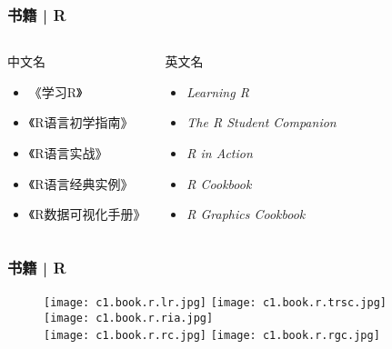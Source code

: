 \begin{frame}
  \frametitle{书籍 | R}
  \begin{columns}
  \begin{block}{中文名}
    \begin{itemize}
      \item 《学习R》
      \item 《R语言初学指南》
      \item 《R语言实战》
      \item 《R语言经典实例》
      \item 《R数据可视化手册》
    \end{itemize}
  \end{block}
  \begin{block}{英文名}
    \begin{itemize}
      \item \textit{Learning R}
      \item \textit{The R Student Companion}
      \item \textit{R in Action}
      \item \textit{R Cookbook}
      \item \textit{R Graphics Cookbook}
    \end{itemize}
  \end{block}
\end{columns}
\end{frame}

\begin{frame}
  \frametitle{书籍 | R}
  \begin{figure}
    \centering
    \texttt{[image: c1.book.r.lr.jpg]}\qquad
    \texttt{[image: c1.book.r.trsc.jpg]}\qquad
    \texttt{[image: c1.book.r.ria.jpg]}\\
    \texttt{[image: c1.book.r.rc.jpg]}\qquad
    \texttt{[image: c1.book.r.rgc.jpg]}
  \end{figure}
\end{frame}

